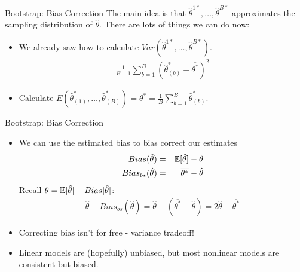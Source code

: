 \begin{frame}{Bootstrap: Bias Correction}
\small
The main idea is that $\hat{\theta}^{1*},\ldots, \hat{\theta}^{B*}$ approximates the \alert{sampling distribution} of $\hat{\theta}$. There are lots of things we can do now:
\begin{itemize}
\item We already saw how to calculate $Var(\hat{\theta}^{1*},\ldots, \hat{\theta}^{B*})$.
\begin{eqnarray*}
\frac{1}{B-1} \sum_{b=1}^B (\hat{\theta}_{(b)}^* - \overline{\theta^{*}})^2
\end{eqnarray*}
\item Calculate $E(\hat{\theta}^{*}_{(1)},\ldots, \hat{\theta}^{*}_{(B)}) = \overline{\theta^{*}} = \frac{1}{B} \sum_{b=1}^B \hat{\theta}_{(b)}^*$.
\end{itemize}
\end{frame}

\begin{frame}{Bootstrap: Bias Correction}
\begin{itemize}
\item We can use the estimated bias to \alert{bias correct} our estimates
\begin{eqnarray*}
Bias(\hat{\theta}) &=&\mathbb{E}[\hat{\theta}] - \theta \\
Bias_{bs}(\hat{\theta}) &=&\overline{\theta^{*}} -\hat{\theta}
\end{eqnarray*}
Recall $\theta = \mathbb{E}[\hat{\theta}] - Bias[\hat{\theta}]$:
\begin{eqnarray*}
\hat{\theta}- Bias_{bs}(\hat{\theta}) = \hat{\theta}-(\overline{\theta^{*}}-\hat{\theta}) = 2 \hat{\theta} - \overline{\theta^{*}}
\end{eqnarray*}
\item Correcting bias isn't for free - variance tradeoff!
\item Linear models are (hopefully) unbiased, but most nonlinear models are \alert{consistent but biased}.
\end{itemize}

\end{frame}

